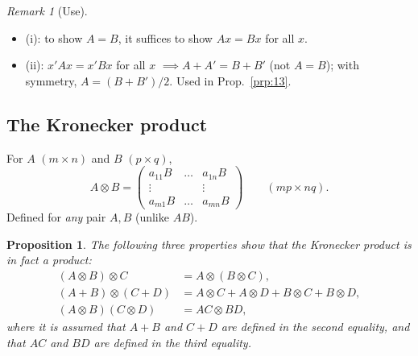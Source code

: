 \documentclass[14pt]{extarticle}
\theoremstyle{plain}
\newtheorem{proposition}{Proposition}
\theoremstyle{definition}
\theoremstyle{remark}
\newtheorem{remark}{Remark}
\begin{document}
\begin{remark}[Use]
\leavevmode
\begin{itemize}
\item (i): to show $A = B$, it suffices to show $Ax = Bx$ for all $x$.
\item (ii): $x'Ax = x'Bx$ for all $x$ $\implies A + A' = B + B'$ (not $A = B$); with symmetry, $A = (B+B')/2$. Used in Prop.~\ref{prp:13}.
\end{itemize}
\end{remark}

\subsection{The Kronecker product}\label{sec:2.3}

For $A$ $(m\times n)$ and $B$ $(p\times q)$,
\begin{equation}\label{eq:2}
A \otimes B = \begin{pmatrix}
a_{11}B & \dots & a_{1n}B \\
\vdots & & \vdots \\
a_{m1}B & \dots & a_{mn}B
\end{pmatrix}
\qquad (mp \times nq).
\end{equation}
Defined for \emph{any} pair $A, B$ (unlike $AB$).

\begin{proposition}\label{prp:3}
The following three properties show that the Kronecker product is in fact a product:
\begin{align*}
(A \otimes B) \otimes C &= A \otimes (B \otimes C), \\
(A + B) \otimes (C + D) &= A \otimes C + A \otimes D + B \otimes C + B \otimes D, \\
(A \otimes B)(C \otimes D) &= AC \otimes BD,
\end{align*}
where it is assumed that $A + B$ and $C + D$ are defined in the second equality, and that $AC$ and $BD$ are defined in the third equality.
\end{proposition}
\end{document}
